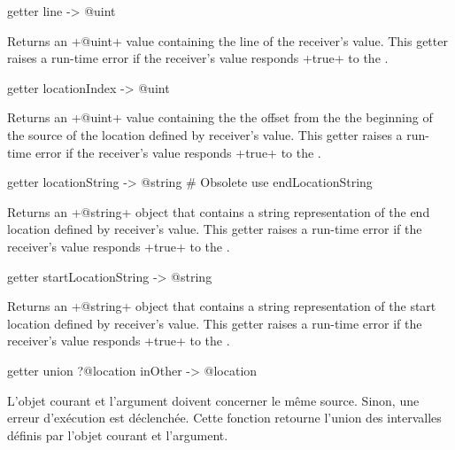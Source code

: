 
\begin{galgas}
getter line -> @uint
\end{galgas}

Returns an \ggs+@uint+ value containing the line of the receiver's value. This getter raises a run-time error if the receiver's value responds \ggs+true+ to the .



\begin{galgas}
getter locationIndex -> @uint
\end{galgas}

Returns an \ggs+@uint+ value containing the the offset from the the beginning of the source of the location defined by receiver's value. This getter raises a run-time error if the receiver's value responds \ggs+true+ to the .




\begin{galgas}
getter locationString -> @string # Obsolete use endLocationString
\end{galgas}

Returns an \ggs+@string+ object that contains a string representation of the end location defined by receiver's value. This getter raises a run-time error if the receiver's value responds \ggs+true+ to the .



\begin{galgas}
getter startLocationString -> @string
\end{galgas}


Returns an \ggs+@string+ object that contains a string representation of the start location defined by receiver's value. This getter raises a run-time error if the receiver's value responds \ggs+true+ to the .



\begin{galgas}
getter union ?@location inOther -> @location
\end{galgas}

L'objet courant et l'argument doivent concerner le même source. Sinon, une erreur d'exécution est déclenchée. Cette fonction retourne l'union des intervalles définis par l'objet courant et l'argument. 

